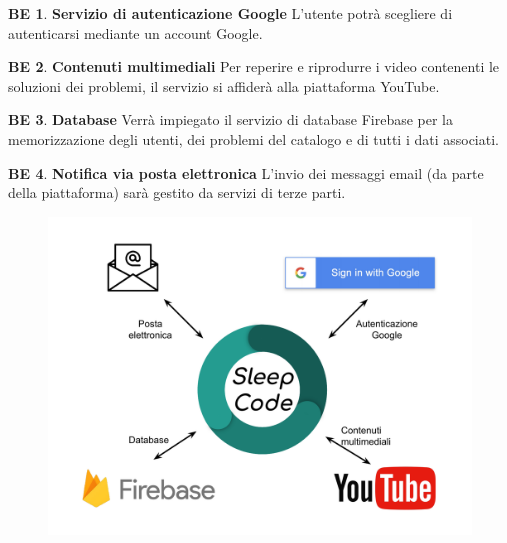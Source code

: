\documentclass[11pt, a4paper]{article}
\theoremstyle{definition}
\newtheorem{backend}{BE}
\begin{document}
\begin{backend}
\textbf{Servizio di autenticazione Google }
L'utente potrà scegliere di autenticarsi mediante un account Google.
\end{backend}

\begin{backend}
\textbf{Contenuti multimediali }
Per reperire e riprodurre i video contenenti le soluzioni dei problemi,
il servizio si affiderà alla piattaforma YouTube.
\end{backend}

\begin{backend}
\textbf{Database }
Verrà impiegato il servizio di database Firebase per la memorizzazione
degli utenti, dei problemi del catalogo e di tutti i dati associati.
\end{backend}

\begin{backend}
\textbf{Notifica via posta elettronica }
L'invio dei messaggi email (da parte della piattaforma) sarà gestito da servizi di terze parti.
\end{backend}

\begin{figure}[H]
\centering
\includegraphics[scale=0.35]{materiale/immaginife/backend.pdf}
\end{figure}

\end{document}
